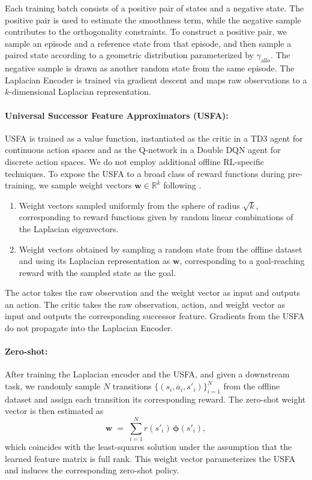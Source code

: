 \documentclass{article}
\theoremstyle{plain}
\theoremstyle{definition}
\theoremstyle{remark}
\begin{document}
Each training batch consists of a positive pair of states and a negative state. The positive pair is used to estimate the smoothness term, while the negative sample contributes to the orthogonality constraints. To construct a positive pair, we sample an episode and a reference state from that episode, and then sample a paired state according to a geometric distribution parameterized by $\gamma_{\text{allo}}$. The negative sample is drawn as another random state from the same episode. The Laplacian Encoder is trained via gradient descent and maps raw observations to a $k$-dimensional Laplacian representation.

\paragraph{Universal Successor Feature Approximators (USFA):}
USFA is trained as a value function, instantiated as the critic in a TD3 agent for continuous action spaces and as the Q-network in a Double DQN agent for discrete action spaces. We do not employ additional offline RL-specific techniques. To expose the USFA to a broad class of reward functions during pre-training, we sample weight vectors $\mathbf{w} \in \mathbb{R}^k$ following \citet{touati2022does}.
\begin{enumerate}
    \item Weight vectors sampled uniformly from the sphere of radius $\sqrt{k}$, corresponding to reward functions given by random linear combinations of the Laplacian eigenvectors.
    \item Weight vectors obtained by sampling a random state from the offline dataset and using its Laplacian representation as $\mathbf{w}$, corresponding to a goal-reaching reward with the sampled state as the goal.
\end{enumerate}
The actor takes the raw observation and the weight vector as input and outputs an action. The critic takes the raw observation, action, and weight vector as input and outputs the corresponding successor feature. Gradients from the USFA do not propagate into the Laplacian Encoder.

\paragraph{Zero-shot:}
After training the Laplacian encoder and the USFA, and given a downstream task, we randomly sample $N$ transitions $\{(s_i, a_i, s'_i)\}_{i=1}^N$ from the offline dataset and assign each transition its corresponding reward. The zero-shot weight vector is then estimated as
\[
\mathbf{w} \;=\; \sum_{i=1}^N r(s'_i)\,\boldsymbol{\phi}(s'_i),
\]
which coincides with the least-squares solution under the assumption that the learned feature matrix is full rank. This weight vector parameterizes the USFA and induces the corresponding zero-shot policy.
\end{document}
